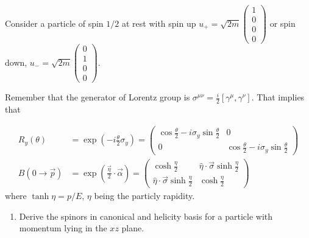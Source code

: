 


Consider a particle of spin $1/2$ at rest with spin up $u_{+} = \sqrt{2m}\begin{pmatrix} 1 \\ 0 \\ 0 \\ 0\end{pmatrix}$ or spin down, $u_{-} = \sqrt{2m}\begin{pmatrix} 0 \\ 1 \\ 0 \\ 0\end{pmatrix}$.

Remember that the generator of Lorentz group is $\sigma^{\mu\nu} = \frac{i}{2}\left[\gamma^\mu,\gamma^\nu\right]$. That implies that

\begin{align}
 R_y(\theta) &= \exp\left(-i\frac{\theta}{2} \sigma_y\right) = \begin{pmatrix} \cos \frac{\theta}{2} - i \sigma_y \sin \frac{\theta}{2} & 0\\
0 & \cos \frac{\theta}{2} - i \sigma_y \sin \frac{\theta}{2}
                                                            \end{pmatrix}\\
B(0 \to \vec p) &= \exp\left(\frac{\vec\eta}{2} \cdot \vec \alpha \right) = \begin{pmatrix} \cosh \frac{\eta}{2} & \hat \eta \cdot \vec \sigma \sinh \frac{\eta}{2} \\
\hat \eta \cdot \vec \sigma \sinh \frac{\eta}{2} & \cosh \frac{\eta}{2} 
                                                            \end{pmatrix}
\end{align}
where $\tanh\eta = p/E$, $\eta$ being the particly rapidity.


\begin{enumerate}
\item Derive the spinors in canonical and helicity basis for a particle with momentum lying in the $xz$ plane.
\end{enumerate}
